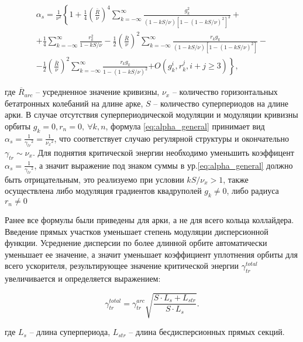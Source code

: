 \begin{equation}
\begin{gathered}
\alpha_s=\frac{1}{\nu^2}\left\{1+\frac{1}{4}\left(\frac{\bar{R}}{\nu}\right)^4 \sum_{k=-\infty}^{\infty}\right.
\frac{g_k^2}{(1-k S / \nu)\left[1-(1-k S / \nu)^2\right]^2}+ \\
+\frac{1}{4} \sum_{k=-\infty}^{\infty} \frac{r_k^2}{1-k S / \nu} -\frac{1}{2}\left(\frac{\bar{R}}{\nu}\right)^2 \sum_{k=-\infty}^{\infty} \frac{r_k g_k}{(1-k S / \nu)\left[1-(1-k S / \nu)^2\right]} - \\
-\frac{1}{2}\left(\frac{\bar{R}}{\nu}\right)^2 \sum_{k=-\infty}^{\infty} \frac{r_k g_k}{1-(1-k S / \nu)^2}
\left.+O\left(g_k^i, r_k^j, i+j \geq 3\right)\right\},
\end{gathered}
\label{eq:alpha_general}
\end{equation}

\noindent где ${\overline{R}}_{arc}$ -- усредненное значение кривизны, $\nu_{x}$ -- количество горизонтальных бетатронных колебаний на длине арке, $S$ -- количество суперпериодов на длине арки. В случае отсутствия суперпериодической модуляции и модуляции кривизны орбиты $g_k=0, r_n=0, \  \forall k,n$, формула \ref{eq:alpha_general} принимает вид $\alpha_s=\frac{1}{{\gamma_{tr}}^2}=\frac{1}{{\nu_x}^2}$, что соответствует случаю регулярной структуры и окончательно  $\gamma_{tr}\sim\nu_x$. Для поднятия критической энергии необходимо уменьшить коэффицент $\alpha_s=\frac{1}{{\gamma_{tr}}^2}$, а значит выражение под знаком суммы в ур.\ref{eq:alpha_general} должно быть отрицательным, это реализуемо при условии $kS/\nu_{x}>1$, также осуществлена либо модуляция градиентов квадруполей $g_k\not=0$, либо радиуса $r_n\not=0$

\par Ранее все формулы были приведены для арки, а не для всего кольца коллайдера. Введение прямых участков уменьшает степень модуляции дисперсионной функции. Усреднение дисперсии по более длинной орбите автоматически уменьшает ее значение, а значит уменьшает коэффициент уплотнения орбиты для всего ускорителя, результирующее значение критической энергии $\gamma_{tr}^{total}$ увеличивается и определяется выражением:

\begin{equation}
\gamma_{tr}^{total}=\gamma_{tr}^{arc}\sqrt{\frac{S\cdot L_s+L_{str}}{S\cdot L_s}}.
\label {eq:gamma_tr_modulated}
\end{equation}

\noindent где $L_s$ -- длина суперпериода, $L_{str}$ -- длина бесдисперсионных прямых секций.

